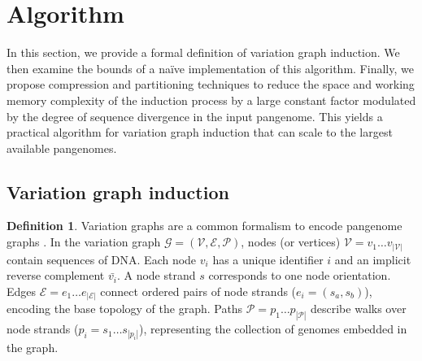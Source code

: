 \documentclass{bioinfo}
\theoremstyle{definition}
\newtheorem{definition}{Definition}[section]
\begin{document}




\section{Algorithm}
\label{sec:algorithm}

In this section, we provide a formal definition of variation graph induction.
We then examine the bounds of a na\"{i}ve implementation of this algorithm.
Finally, we propose compression and partitioning techniques to reduce the space and working memory complexity of the induction process by a large constant factor modulated by the degree of sequence divergence in the input pangenome.
This yields a practical algorithm for variation graph induction that can scale to the largest available pangenomes.

\subsection{Variation graph induction}

\begin{definition}
\label{def:vg}
Variation graphs are a common formalism to encode pangenome graphs \citep{Garrison_2018_thesis}.
In the variation graph $\mathcal{G} = (\mathcal{V}, \mathcal{E}, \mathcal{P})$, nodes (or vertices) $\mathcal{V} = v_1\ldots v_{|\mathcal{V}|}$ contain sequences of DNA.
Each node $v_i$ has a unique identifier $i$ and an implicit reverse complement $\bar{v_i}$.
A node strand $s$ corresponds to one node orientation.
Edges $\mathcal{E} = e_1\ldots e_{|\mathcal{E}|}$ connect ordered pairs of node strands ($e_i = ( s_a, s_b )$), encoding the base topology of the graph.
Paths $\mathcal{P} = p_1\ldots p_{|\mathcal{P}|}$ describe walks over node strands ($p_i = s_1 \ldots s_{|p_i|}$), representing the collection of genomes embedded in the graph.
\end{definition}
\end{document}

